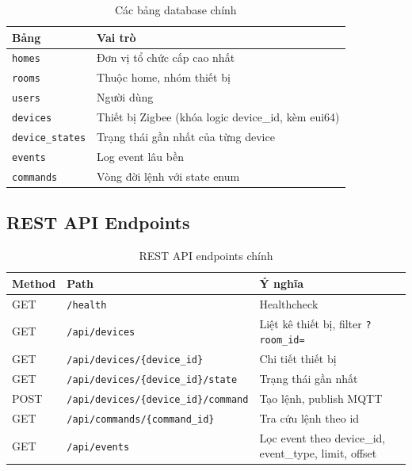\begin{table}[H]
\centering
\caption{Các bảng database chính}
\label{tab:ch2-db-tables}
\begin{tabular}{|l|p{9cm}|}
\hline
\textbf{Bảng} & \textbf{Vai trò} \\ \hline
\texttt{homes} & Đơn vị tổ chức cấp cao nhất \\ \hline
\texttt{rooms} & Thuộc home, nhóm thiết bị \\ \hline
\texttt{users} & Người dùng \\ \hline
\texttt{devices} & Thiết bị Zigbee (khóa logic device\_id, kèm eui64) \\ \hline
\texttt{device\_states} & Trạng thái gần nhất của từng device \\ \hline
\texttt{events} & Log event lâu bền \\ \hline
\texttt{commands} & Vòng đời lệnh với state enum \\ \hline
\end{tabular}
\end{table}

\subsection{REST API Endpoints}
\label{sec:ch2-api}

\begin{table}[H]
\centering
\caption{REST API endpoints chính}
\label{tab:ch2-api-endpoints}
\begin{tabular}{|l|l|p{6cm}|}
\hline
\textbf{Method} & \textbf{Path} & \textbf{Ý nghĩa} \\ \hline
GET & \texttt{/health} & Healthcheck \\ \hline
GET & \texttt{/api/devices} & Liệt kê thiết bị, filter \texttt{?room\_id=} \\ \hline
GET & \texttt{/api/devices/\{device\_id\}} & Chi tiết thiết bị \\ \hline
GET & \texttt{/api/devices/\{device\_id\}/state} & Trạng thái gần nhất \\ \hline
POST & \texttt{/api/devices/\{device\_id\}/command} & Tạo lệnh, publish MQTT \\ \hline
GET & \texttt{/api/commands/\{command\_id\}} & Tra cứu lệnh theo id \\ \hline
GET & \texttt{/api/events} & Lọc event theo device\_id, event\_type, limit, offset \\ \hline
\end{tabular}
\end{table}

